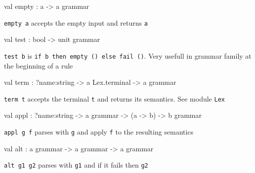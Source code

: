 \documentclass[11pt]{article}
\begin{document}
\label{val:Grammar.empty}\begin{ocamldoccode}
val empty : {\textquotesingle}a -> {\textquotesingle}a grammar
\end{ocamldoccode}
\begin{ocamldocdescription}
{\tt{empty a}} accepts the empty input and returns {\tt{a}}


\end{ocamldocdescription}




\label{val:Grammar.test}\begin{ocamldoccode}
val test : bool -> unit grammar
\end{ocamldoccode}
\begin{ocamldocdescription}
{\tt{test b}} is {\tt{if b then empty () else fail ()}}. Very usefull in
    grammar family at the beginning of a rule


\end{ocamldocdescription}




\label{val:Grammar.term}\begin{ocamldoccode}
val term : ?name:string -> {\textquotesingle}a Lex.terminal -> {\textquotesingle}a grammar
\end{ocamldoccode}
\begin{ocamldocdescription}
{\tt{term t}} accepts the terminal {\tt{t}} and returns its semantics.
    See module {\tt{Lex}}


\end{ocamldocdescription}




\label{val:Grammar.appl}\begin{ocamldoccode}
val appl : ?name:string -> {\textquotesingle}a grammar -> ({\textquotesingle}a -> {\textquotesingle}b) -> {\textquotesingle}b grammar
\end{ocamldoccode}
\begin{ocamldocdescription}
{\tt{appl g f}} parses with {\tt{g}} and apply {\tt{f}} to the resulting semantics


\end{ocamldocdescription}




\label{val:Grammar.alt}\begin{ocamldoccode}
val alt : {\textquotesingle}a grammar -> {\textquotesingle}a grammar -> {\textquotesingle}a grammar
\end{ocamldoccode}
\begin{ocamldocdescription}
{\tt{alt g1 g2}} parses with {\tt{g1}} and if it fails then {\tt{g2}}


\end{ocamldocdescription}
\end{document}

